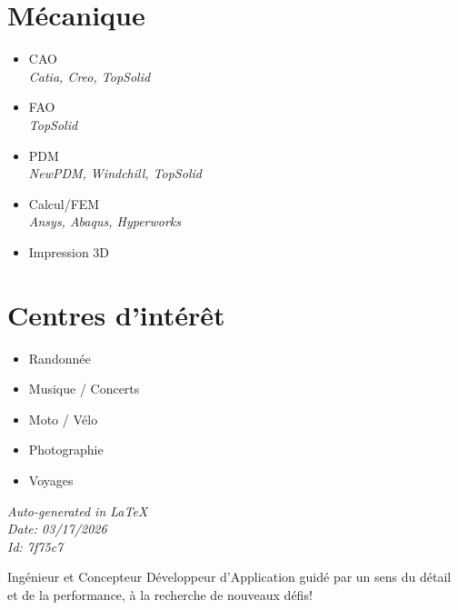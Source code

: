 \documentclass[]{friggeri-cv}
\begin{document}
\begin{aside}
\section{Mécanique}
\begin{itemize}
\item CAO
 \\ \hspace*{0.2em}\small\textit{Catia, Creo, TopSolid}
\item FAO
 \\ \hspace*{0.2em}\small\textit{TopSolid}
\item PDM
 \\ \hspace*{0.2em}\small\textit{NewPDM, Windchill, TopSolid}
\item Calcul/FEM
 \\ \hspace*{0.2em}\small\textit{Ansys, Abaqus, Hyperworks}
\item Impression 3D
\end{itemize}
\section{Centres d'intérêt}
\begin{itemize}
\item Randonnée
\item Musique / Concerts
\item Moto / Vélo
\item Photographie
\item Voyages
\end{itemize}
\vspace{2.5mm}%
\small \emph{Auto-generated in \LaTeX}\\
\small \emph{Date: 03/17/2026} \hspace*{8mm}\\
\small \emph{Id: 7f75c7} %

\end{aside}

\vspace*{-2.0mm}
\noindent\parbox{\linewidth}{
  \centering
  Ingénieur et Concepteur Développeur d'Application guidé par un sens du détail et de la performance, à la recherche de nouveaux défis!
}
\vspace*{0.8mm}
\end{document}
